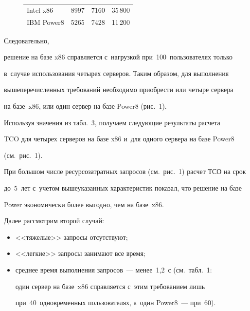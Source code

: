 \begin{figure}
\begin{minipage}[c]{66mm}
{\begin{center}
\begin{tabular}{|l|c|c|c|}
  \hline

   Intel x86 &  8997& 7160& 35\,800\\

   IBM Power8&5265& 7428& 11\,200\\

  \hline

  \end{tabular}

  \end{center}}

  \end{minipage}



  \end{figure}

  Следовательно, 

решение на базе x86 справляется с~нагрузкой при~100~пользователях только 

в~случае использования четырех серверов. Таким образом, для выполнения 

вышеперечисленных требований необходимо приобрести или четыре сервера 

на базе~x86, или один сервер на базе Power8 (рис.~1).

  

  Используя значения из табл.~3, получаем следующие результаты расчета 

TCO для четырех серверов на базе x86 и~для одного сервера на базе Power8 

(см.\ рис.~1).



 

  

  При большом числе ресурсозатратных запросов (см.\ рис.~1) расчет ТСО на срок 

до~5~лет с~учетом вышеуказанных характеристик показал, что решение на базе 

Power экономически более выгодно, чем на базе~x86. 

  

  Далее рассмотрим второй случай: 

  \begin{itemize}

\item <<тяжелые>> запросы отсутствуют;

\item <<легкие>> запросы занимают все время;

\item среднее время выполнения запросов~--- менее~1,2~с (см.\ табл.~1: 

один сервер на базе~x86 справляется с~этим требованием лишь 

при~40~одновременных пользователях, а~один Power8~--- при~60).

\end{itemize}



